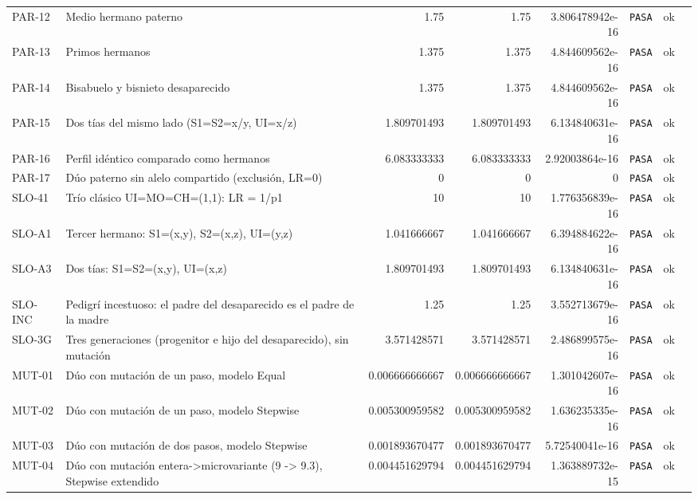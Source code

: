 \documentclass[11pt,a4paper]{article}
\begin{document}
\begin{landscape}
\begin{longtable}{@{}lp{268pt}rrrlll@{}}
PAR-12 & Medio hermano paterno & 1.75 & 1.75 & 3.806478942e-16 & \textcolor{pasa}{\texttt{PASA}} & ok &  \\
PAR-13 & Primos hermanos & 1.375 & 1.375 & 4.844609562e-16 & \textcolor{pasa}{\texttt{PASA}} & ok &  \\
PAR-14 & Bisabuelo y bisnieto desaparecido & 1.375 & 1.375 & 4.844609562e-16 & \textcolor{pasa}{\texttt{PASA}} & ok &  \\
PAR-15 & Dos tías del mismo lado (S1=S2=x/y, UI=x/z) & 1.809701493 & 1.809701493 & 6.134840631e-16 & \textcolor{pasa}{\texttt{PASA}} & ok &  \\
PAR-16 & Perfil idéntico comparado como hermanos & 6.083333333 & 6.083333333 & 2.92003864e-16 & \textcolor{pasa}{\texttt{PASA}} & ok &  \\
PAR-17 & Dúo paterno sin alelo compartido (exclusión, LR=0) & 0 & 0 & 0 & \textcolor{pasa}{\texttt{PASA}} & ok &  \\
SLO-41 & Trío clásico UI=MO=CH=(1,1): LR = 1/p1 & 10 & 10 & 1.776356839e-16 & \textcolor{pasa}{\texttt{PASA}} & ok &  \\
SLO-A1 & Tercer hermano: S1=(x,y), S2=(x,z), UI=(y,z) & 1.041666667 & 1.041666667 & 6.394884622e-16 & \textcolor{pasa}{\texttt{PASA}} & ok &  \\
SLO-A3 & Dos tías: S1=S2=(x,y), UI=(x,z) & 1.809701493 & 1.809701493 & 6.134840631e-16 & \textcolor{pasa}{\texttt{PASA}} & ok &  \\
SLO-INC & Pedigrí incestuoso: el padre del desaparecido es el padre de la madre & 1.25 & 1.25 & 3.552713679e-16 & \textcolor{pasa}{\texttt{PASA}} & ok &  \\
SLO-3G & Tres generaciones (progenitor e hijo del desaparecido), sin mutación & 3.571428571 & 3.571428571 & 2.486899575e-16 & \textcolor{pasa}{\texttt{PASA}} & ok &  \\
MUT-01 & Dúo con mutación de un paso, modelo Equal & 0.006666666667 & 0.006666666667 & 1.301042607e-16 & \textcolor{pasa}{\texttt{PASA}} & ok &  \\
MUT-02 & Dúo con mutación de un paso, modelo Stepwise & 0.005300959582 & 0.005300959582 & 1.636235335e-16 & \textcolor{pasa}{\texttt{PASA}} & ok &  \\
MUT-03 & Dúo con mutación de dos pasos, modelo Stepwise & 0.001893670477 & 0.001893670477 & 5.72540041e-16 & \textcolor{pasa}{\texttt{PASA}} & ok &  \\
MUT-04 & Dúo con mutación entera->microvariante (9 -> 9.3), Stepwise extendido & 0.004451629794 & 0.004451629794 & 1.363889732e-15 & \textcolor{pasa}{\texttt{PASA}} & ok &  \\

\end{longtable}
\end{landscape}
\end{document}
